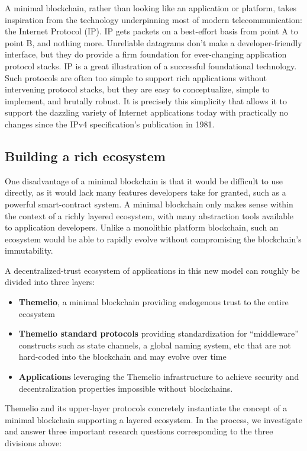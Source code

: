 \documentclass[headinclude,12pt]{scrbook}
\begin{document}
A minimal blockchain, rather than looking like an application or platform, takes inspiration from the technology underpinning most of modern telecommunication: the Internet Protocol (IP). IP gets packets on a best-effort basis from point A to point B, and nothing more. Unreliable datagrams don't make a developer-friendly interface, but they do provide a firm foundation for ever-changing application protocol stacks. IP is a great illustration of a successful foundational technology. Such protocols are often too simple to support rich applications without intervening protocol stacks, but they are easy to conceptualize, simple to implement, and brutally robust. It is precisely this simplicity that allows it to support the dazzling variety of Internet applications today with practically no changes since the IPv4 specification's publication in 1981.

\subsection{Building a rich ecosystem}

One disadvantage of a minimal blockchain is that it would be difficult to use directly, as it would lack many features developers take for granted, such as a powerful smart-contract system. A minimal blockchain only makes sense within the context of a richly layered ecosystem, with many abstraction tools available to application developers. Unlike a monolithic platform blockchain, such an ecosystem would be able to rapidly evolve without compromising the blockchain's immutability.

A decentralized-trust ecosystem of applications in this new model can roughly be divided into three layers:

\begin{itemize}
    \item \textbf{Themelio}, a minimal blockchain providing endogenous trust to the entire ecosystem
    \item \textbf{Themelio standard protocols} providing standardization for ``middleware'' constructs such as state channels, a global naming system, etc that are not hard-coded into the blockchain and may evolve over time
    \item \textbf{Applications} leveraging the Themelio infrastructure to achieve security and decentralization properties impossible without blockchains.
\end{itemize}

Themelio and its upper-layer protocols concretely instantiate the concept of a minimal blockchain supporting a layered ecosystem. In the process, we investigate and answer three important research questions corresponding to the three divisions above:
\end{document}

